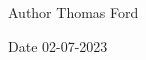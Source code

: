 \begin{DoxyAuthor}{Author}
Thomas Ford 
\end{DoxyAuthor}
\begin{DoxyDate}{Date}
02-\/07-\/2023 
\end{DoxyDate}
